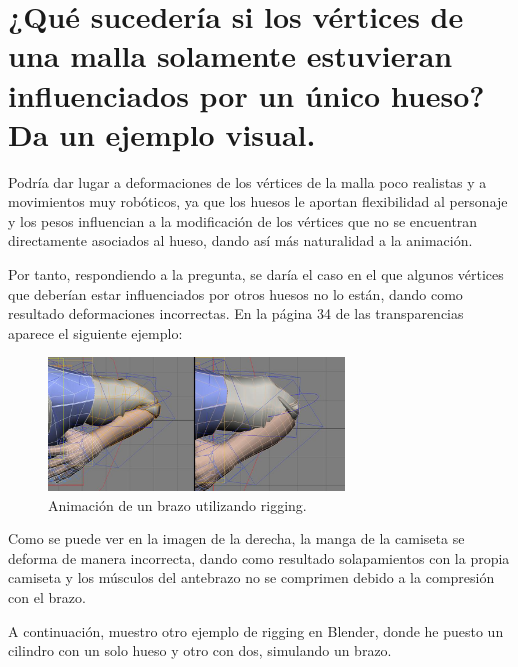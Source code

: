 \documentclass[]{article}
\begin{document}
\section{¿Qué sucedería si los vértices de una malla solamente estuvieran influenciados por un único hueso? Da un ejemplo visual.}

Podría dar lugar a deformaciones de los vértices de la malla poco realistas y a movimientos muy robóticos, ya que los huesos le aportan flexibilidad al personaje y los pesos influencian a la modificación de los vértices que no se encuentran directamente asociados al hueso, dando así más naturalidad a la animación.

\bigskip

Por tanto, respondiendo a la pregunta, se daría el caso en el que algunos vértices que deberían estar influenciados por otros huesos no lo están, dando como resultado deformaciones incorrectas. En la página 34 de las transparencias aparece el siguiente ejemplo:


\begin{figure}[H]
   \centering
   \includegraphics[width=0.7\textwidth]{imagenes/pag34.png}
   \caption{Animación de un brazo utilizando rigging\cite{diapos}.}
\end{figure}

Como se puede ver en la imagen de la derecha, la manga de la camiseta se deforma de manera incorrecta, dando como resultado solapamientos con la propia camiseta y los músculos del antebrazo no se comprimen debido a la compresión con el brazo.

\bigskip
\newpage

A continuación, muestro otro ejemplo de rigging en Blender, donde he puesto un cilindro con un solo hueso y otro con dos, simulando un brazo.
\end{document}
